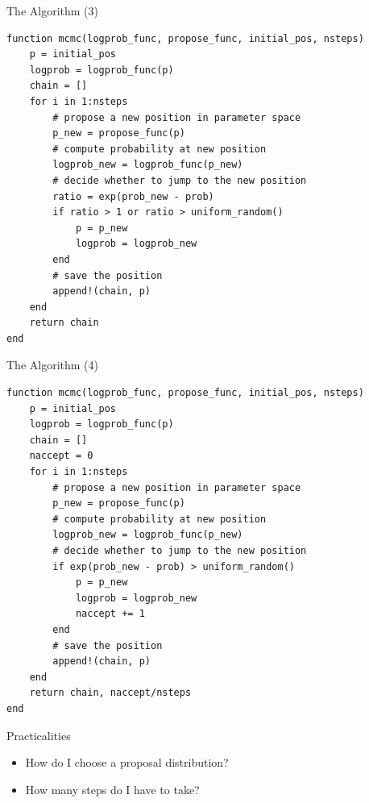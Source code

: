 \documentclass{beamer}
\begin{document}
\begin{frame}[fragile]{The Algorithm (3)}
\begin{footnotesize}
\begin{verbatim}
function mcmc(logprob_func, propose_func, initial_pos, nsteps)
    p = initial_pos
    logprob = logprob_func(p)
    chain = []
    for i in 1:nsteps
        # propose a new position in parameter space
        p_new = propose_func(p)
        # compute probability at new position
        logprob_new = logprob_func(p_new)
        # decide whether to jump to the new position
        ratio = exp(prob_new - prob)
        if ratio > 1 or ratio > uniform_random()
            p = p_new
            logprob = logprob_new
        end
        # save the position
        append!(chain, p)
    end
    return chain
end
\end{verbatim}
\end{footnotesize}
\end{frame}

\begin{frame}[fragile]{The Algorithm (4)}
\begin{scriptsize}
\begin{verbatim}
function mcmc(logprob_func, propose_func, initial_pos, nsteps)
    p = initial_pos
    logprob = logprob_func(p)
    chain = []
    naccept = 0
    for i in 1:nsteps
        # propose a new position in parameter space
        p_new = propose_func(p)
        # compute probability at new position
        logprob_new = logprob_func(p_new)
        # decide whether to jump to the new position
        if exp(prob_new - prob) > uniform_random()
            p = p_new
            logprob = logprob_new
            naccept += 1
        end
        # save the position
        append!(chain, p)
    end
    return chain, naccept/nsteps
end
\end{verbatim}
\end{scriptsize}
\end{frame}









%
%
%


\begin{frame}{Practicalities}
\begin{itemize}
\item How do I choose a proposal distribution?
\item How many steps do I have to take?
\end{itemize}
\end{frame}
\end{document}
